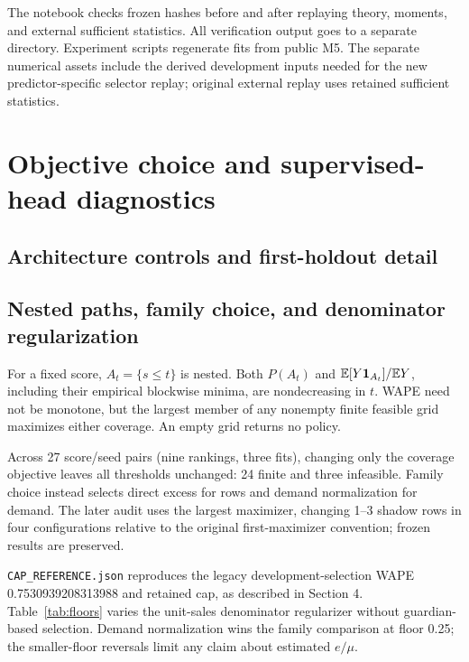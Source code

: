 The notebook checks frozen hashes before and after replaying theory, moments, and external sufficient statistics. All verification output goes to a separate directory. Experiment scripts regenerate fits from public M5. The separate numerical assets include the derived development inputs needed for the new predictor-specific selector replay; original external replay uses retained sufficient statistics.

\section{Objective choice and supervised-head diagnostics}
\label{app:objective}


\subsection{Architecture controls and first-holdout detail}
\label{app:architecture}


\subsection{Nested paths, family choice, and denominator regularization}
For a fixed score, $A_t=\{s\leq t\}$ is nested. Both $P(A_t)$ and $\mathbb{E}[Y\mathbf{1}_{A_t}]/\mathbb{E} Y$, including their empirical blockwise minima, are nondecreasing in $t$. WAPE need not be monotone, but the largest member of any nonempty finite feasible grid maximizes either coverage. An empty grid returns no policy.

Across 27 score/seed pairs (nine rankings, three fits), changing only the coverage objective leaves all thresholds unchanged: 24 finite and three infeasible. Family choice instead selects direct excess for rows and demand normalization for demand. The later audit uses the largest maximizer, changing 1--3 shadow rows in four configurations relative to the original first-maximizer convention; frozen results are preserved.

\texttt{CAP\_REFERENCE.json} reproduces the legacy development-selection WAPE 0.7530939208313988 and retained cap, as described in Section 4. Table~\ref{tab:floors} varies the unit-sales denominator regularizer without guardian-based selection. Demand normalization wins the family comparison at floor 0.25; the smaller-floor reversals limit any claim about estimated $e/\mu$.


